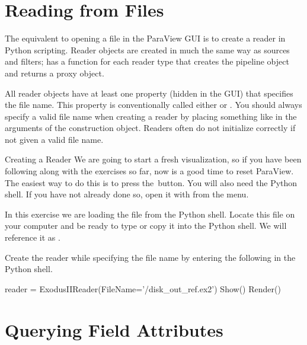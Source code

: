 \section{Reading from Files}
\label{sec:ReadingFromFiles}

The equivalent to opening a file in the ParaView GUI is to create a reader
in Python scripting.  Reader objects are created in much the same way as
sources and filters;  has a function for each
reader type that creates the pipeline object and returns a proxy object.

All reader objects have at least one property (hidden in the GUI) that
specifies the file name.  This property is conventionally called either
 or .  You should always specify a valid
file name when creating a reader by placing something like
 in the arguments of the construction
object.  Readers often do not initialize correctly if not given a valid
file name.

\begin{exercise}{Creating a Reader}
  \label{ex:CreatingAReader}%
  We are going to start a fresh visualization, so if you have been
  following along with the exercises so far, now is a good time to reset
  ParaView.  The easiest way to do this is to press the~\disconnect button.
  You will also need the Python shell.  If you have not already done so,
  open it with  \ra {} from the menu.

  In this exercise we are loading the  file from
  the Python shell.  Locate this file on your computer and be ready to type
  or copy it into the Python shell.  We will reference it as
  .

  Create the reader while specifying the file name by entering the following
  in the Python shell.

  \begin{pythonpluscommands}
reader = ExodusIIReader(FileName='/disk_out_ref.ex2')
Show()
Render()
  \end{pythonpluscommands}
\end{exercise}


\section{Querying Field Attributes}
\label{sec:QueryingFieldAttributes}

